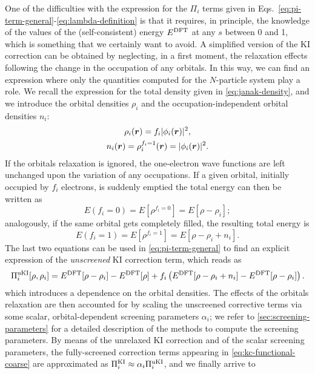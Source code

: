 One of the difficulties with the expression for the $\Pi_i$ terms given in Eqs.~\eqref{eq:pi-term-general}-\eqref{eq:lambda-definition} is that it requires, in principle, the knowledge of the values of the (self-consistent) energy $E^{\rm DFT}$ at any $s$ between 0 and 1, which is something that we certainly want to avoid. A simplified version of the KI correction can be obtained by neglecting, in a first moment, the relaxation effects following the change in the occupation of any orbitals. In this way, we can find an expression where only the quantities computed for the $N$-particle system play a role. We recall the expression for the total density given in \cref{eq:janak-density}, and we introduce the orbital densities $\rho_i$ and the occupation-independent orbital densities $n_i$:
%
\begin{equation}
    \begin{gathered}
    \rho_i({\bm r}) = f_i |\phi_i({\bm r})|^2 , \\
    n_i({\bm r}) = \rho_i^{f_i=1}({\bm r}) = |\phi_i({\bm r})|^2 .
    \end{gathered}
    \label{eq:orbital-densities}
\end{equation}
%
If the orbitals relaxation is ignored, the one-electron wave functions are left unchanged upon the variation of any occupations. If a given orbital, initially occupied by $f_i$ electrons, is suddenly emptied the total energy can then be written as
%
\begin{equation}
    E(f_i=0) = E[\rho^{f_i=0}] = E[\rho-\rho_i] ;
    \label{eq:unrelaxed-energy-emptied-orbital}
\end{equation}
%
analogously, if the same orbital gets completely filled, the resulting total energy is
%
\begin{equation}
    E(f_i=1) = E[\rho^{f_i=1}] = E[\rho-\rho_i+n_i] .
    \label{eq:unrelaxed-energy-filled-orbital}
\end{equation}
%
The last two equations can be used in \cref{eq:pi-term-general} to find an explicit expression of the \emph{unscreened} KI correction term, which reads as
%
\begin{equation}
    \Pi_i^{\rm uKI}[\rho,\rho_i] = E^{\rm DFT}[\rho - \rho_i] - E^{\rm DFT}[\rho] + f_i \left( E^{\rm DFT}[\rho - \rho_i + n_i] - E^{\rm DFT}[\rho - \rho_i] \right) .
    \label{eq:ki-correction}
\end{equation}
%
which introduces a dependence on the orbital densities. The effects of the orbitals relaxation are then accounted for by scaling the unscreened corrective terms via some scalar, orbital-dependent screening parameters $\alpha_i$; we refer to \cref{sec:screening-parameters} for a detailed description of the methods to compute the screening parameters. By means of the unrelaxed KI correction and of the scalar screening parameters, the fully-screened correction terms appearing in \cref{eq:kc-functional-coarse} are approximated as $\Pi_i^{\rm KI} \approx \alpha_i \Pi_i^{\rm uKI}$, and we finally arrive to \cite{borghi_koopmans-compliant_2014}
